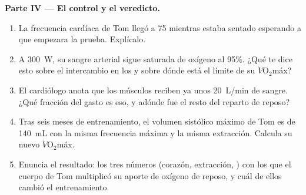 \begin{problem}
\medskip
\noindent\textbf{Parte IV --- El control y el veredicto.}
\begin{enumerate}[resume]
  \item La frecuencia cardíaca de Tom llegó a 75 mientras estaba
        sentado esperando a que empezara la prueba. Explícalo.
  \item A \qty{300}{W}, su sangre arterial sigue saturada de oxígeno al
        95\%. ¿Qué te dice esto sobre el intercambio en los  y
        sobre dónde está el límite de su
        $\dot V\!\mathrm{O_2}$máx?
  \item El cardiólogo anota que los músculos reciben ya unos
        \qty{20}{L/min} de sangre. ¿Qué fracción del gasto es eso, y
        adónde fue el resto del reparto de reposo?
  \item Tras seis meses de entrenamiento, el volumen sistólico máximo
        de Tom es de \qty{140}{mL} con la misma frecuencia máxima y la
        misma extracción. Calcula su nuevo $\dot V\!\mathrm{O_2}$máx.
  \item Enuncia el resultado: los tres números (corazón, extracción,
        ) con los que el cuerpo de Tom multiplicó su aporte
        de oxígeno de reposo, y cuál de ellos cambió el entrenamiento.
\end{enumerate}
\end{problem}
